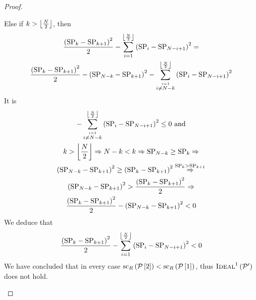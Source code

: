 \begin{proof}
\begin{itemize}
    Else if $k > \floor*{\frac{\playerlen}{2}}$, then
    \begin{gather*}
      \frac{\left(\stpow_k - \stpow_{k+1}\right)^2}{2} - \sum\limits_{i =
      1}^{\floor*{\frac{\playerlen}{2}}} \left(\stpow_i - \stpow_{\playerlen - i
      + 1}\right)^2 = \\
      \frac{\left(\stpow_k - \stpow_{k+1}\right)^2}{2} -
      \left(\stpow_{\playerlen - k} - \stpow_{k + 1}\right)^2 -
      \sum\limits_{\overset{i = 1}{i \neq \playerlen -
      k}}^{\floor*{\frac{\playerlen}{2}}} \left(\stpow_i - \stpow_{\playerlen -
      i + 1}\right)^2
    \end{gather*}
    It is
    \begin{gather*}
      - \sum\limits_{\overset{i = 1}{i \neq \playerlen -
      k}}^{\floor*{\frac{\playerlen}{2}}} \left(\stpow_i - \stpow_{\playerlen -
      i + 1}\right)^2 \leq 0 \text{ and} \\
      k > \floor*{\frac{\playerlen}{2}} \Rightarrow \playerlen - k < k
      \Rightarrow \stpow_{\playerlen - k} \geq \stpow_k \Rightarrow \\
      \left(\stpow_{\playerlen - k} - \stpow_{k + 1}\right)^2 \geq
      \left(\stpow_k - \stpow_{k + 1}\right)^2 \overset{\stpow_k > \stpow_{k +
      1}}{\Rightarrow} \\
      \left(\stpow_{\playerlen - k} - \stpow_{k + 1}\right)^2 >
      \frac{\left(\stpow_k - \stpow_{k + 1}\right)^2}{2} \Rightarrow \\
      \frac{\left(\stpow_k - \stpow_{k + 1}\right)^2}{2} -
      \left(\stpow_{\playerlen - k} - \stpow_{k + 1}\right)^2 < 0
    \end{gather*}
    We deduce that
    \begin{equation*}
      \frac{\left(\stpow_k - \stpow_{k+1}\right)^2}{2} - \sum\limits_{i =
      1}^{\floor*{\frac{\playerlen}{2}}} \left(\stpow_i - \stpow_{\playerlen - i
      + 1}\right)^2 < 0
    \end{equation*}
    We have concluded that in every case
    $\mathrm{sc}_\rounds\left(\postlist\left[2\right]\right) <
    \mathrm{sc}_\rounds\left(\postlist\left[1\right]\right)$, thus
    $\textsc{Ideal}^1\left(\postlist'\right)$ does not hold.


\end{itemize}
\end{proof}
